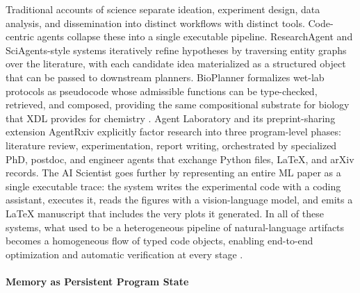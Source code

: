 Traditional accounts of science separate ideation, experiment design, data analysis, and dissemination into distinct workflows with distinct tools. Code-centric agents collapse these into a single executable pipeline. ResearchAgent \citep{baek2025researchagentiterativeresearchidea} and SciAgents-style systems iteratively refine hypotheses by traversing entity graphs over the literature, with each candidate idea materialized as a structured object that can be passed to downstream planners. BioPlanner \citep{odonoghue2023bioplannerautomaticevaluationllms} formalizes wet-lab protocols as pseudocode whose admissible functions can be type-checked, retrieved, and composed, providing the same compositional substrate for biology that XDL provides for chemistry \citep{mehr2020universal}. Agent Laboratory \citep{schmidgall2025agentlaboratoryusingllm} and its preprint-sharing extension AgentRxiv \citep{schmidgall2025agentrxivcollaborativeautonomousresearch} explicitly factor research into three program-level phases: literature review, experimentation, report writing, orchestrated by specialized PhD, postdoc, and engineer agents that exchange Python files, LaTeX, and arXiv records. The AI Scientist \citep{lu2024aiscientistfullyautomated,yamada2025aiscientistv2workshoplevelautomated} goes further by representing an entire ML paper as a single executable trace: the system writes the experimental code with a coding assistant, executes it, reads the figures with a vision-language model, and emits a LaTeX manuscript that includes the very plots it generated. In all of these systems, what used to be a heterogeneous pipeline of natural-language artifacts becomes a homogeneous flow of typed code objects, enabling end-to-end optimization and automatic verification at every stage \citep{ren2026scientificintelligencesurveyllmbased,wang2024executablecodeactionselicit}.

\paragraph{Memory as Persistent Program State}

